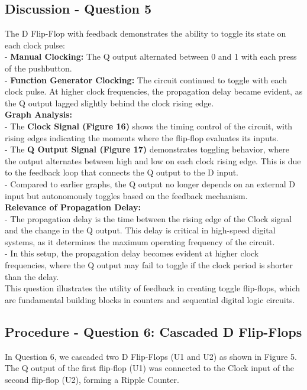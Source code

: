 \documentclass{article}
\begin{document}
    \subsection*{\textbf{Discussion - Question 5}}
    The D Flip-Flop with feedback demonstrates the ability to toggle its state on each clock pulse: \\ 
       - \textbf{Manual Clocking:} The Q output alternated between 0 and 1 with each press of the pushbutton. \\
       - \textbf{Function Generator Clocking:} The circuit continued to toggle with each clock pulse. At higher clock frequencies, the propagation delay became evident, as the Q output lagged slightly behind the clock rising edge. \\
    
    \textbf{Graph Analysis:} \\
       - The \textbf{Clock Signal (Figure 16)} shows the timing control of the circuit, with rising edges indicating the moments where the flip-flop evaluates its inputs. \\
       - The \textbf{Q Output Signal (Figure 17)} demonstrates toggling behavior, where the output alternates between high and low on each clock rising edge. This is due to the feedback loop that connects the Q output to the D input. \\ 
       - Compared to earlier graphs, the Q output no longer depends on an external D input but autonomously toggles based on the feedback mechanism. \\
    
    \textbf{Relevance of Propagation Delay:} \\
       - The propagation delay is the time between the rising edge of the Clock signal and the change in the Q output. This delay is critical in high-speed digital systems, as it determines the maximum operating frequency of the circuit. \\
       - In this setup, the propagation delay becomes evident at higher clock frequencies, where the Q output may fail to toggle if the clock period is shorter than the delay. \\
    
    This question illustrates the utility of feedback in creating toggle flip-flops, which are fundamental building blocks in counters and sequential digital logic circuits.
    

    \subsection*{\textbf{Procedure - Question 6: Cascaded D Flip-Flops}}
    In Question 6, we cascaded two D Flip-Flops (U1 and U2) as shown in Figure 5. The Q output of the first flip-flop (U1) was connected to the Clock input of the second flip-flop (U2), forming a Ripple Counter.
\end{document}
